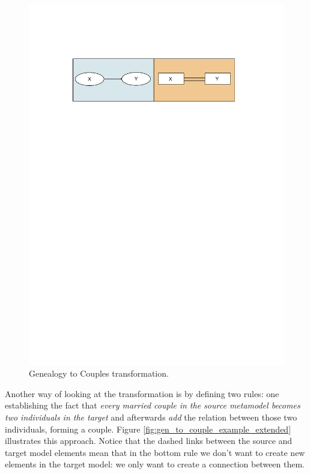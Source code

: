 \begin{figure}[h]
\begin{center}
  \includegraphics[scale=0.9, trim=3.5cm 21.5cm 3.8cm 4.2cm,
  clip]{imgs/gen_to_couple_example.pdf}
  \caption{Genealogy to Couples transformation.}
  \label{fig:gen_to_couple_example}
\end{center}
\end{figure}


Another way of looking at the transformation is by defining two rules: one
establishing the fact that \emph{every married couple in the source metamodel becomes two
individuals in the target} and afterwards \emph{add} the relation between those
two individuals, forming a couple. Figure \ref{fig:gen_to_couple_example_extended} illustrates this approach. Notice that the dashed links between the source and
target model elements mean that in the bottom rule we don't want to create new
elements in the target model: we only want to create a connection between them.

